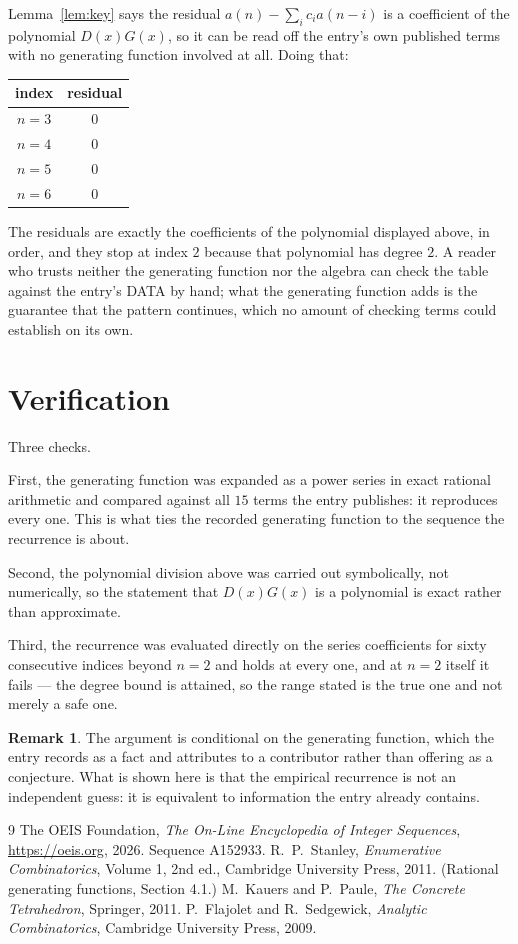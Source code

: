 \documentclass[11pt,a4paper]{article}
\theoremstyle{plain}
\theoremstyle{definition}
\newtheorem{remark}[theorem]{Remark}
\begin{document}
Lemma~\ref{lem:key} says the residual $a(n)-\sum_ic_ia(n-i)$ is a coefficient of the
polynomial $D(x)G(x)$, so it can be read off the entry's own published terms with no
generating function involved at all. Doing that:
\begin{center}
\begin{tabular}{cc}
index & residual \\ \hline
$n=3$ & $0$ \\
$n=4$ & $0$ \\
$n=5$ & $0$ \\
$n=6$ & $0$
\end{tabular}
\end{center}
The residuals are exactly the coefficients of the polynomial displayed above, in order, and
they stop at index $2$ because that polynomial has degree $2$. A reader who trusts
neither the generating function nor the algebra can check the table against the entry's DATA
by hand; what the generating function adds is the guarantee that the pattern continues, which
no amount of checking terms could establish on its own.

\section{Verification}

Three checks.

First, the generating function was expanded as a power series in exact rational arithmetic and
compared against all $15$ terms the entry publishes: it reproduces every one. This is
what ties the recorded generating function to the sequence the recurrence is about.

Second, the polynomial division above was carried out symbolically, not numerically, so the
statement that $D(x)G(x)$ is a polynomial is exact rather than approximate.

Third, the recurrence was evaluated directly on the series coefficients for sixty consecutive
indices beyond $n=2$ and holds at every one, and at $n=2$ itself it fails --- the
degree bound is attained, so the range stated is the true one and not merely a safe one.

\begin{remark}
The argument is conditional on the generating function, which the entry records as a fact and
attributes to a contributor rather than offering as a conjecture. What is shown here is that
the empirical recurrence is not an independent guess: it is equivalent to information the
entry already contains.
\end{remark}

\begin{thebibliography}{9}
 The OEIS Foundation, \emph{The On-Line Encyclopedia of Integer
Sequences}, \url{https://oeis.org}, 2026. Sequence A152933.
 R.~P.~Stanley, \emph{Enumerative Combinatorics}, Volume 1, 2nd ed.,
Cambridge University Press, 2011. (Rational generating functions, Section 4.1.)
 M.~Kauers and P.~Paule, \emph{The Concrete Tetrahedron}, Springer, 2011.
 P.~Flajolet and R.~Sedgewick, \emph{Analytic Combinatorics}, Cambridge
University Press, 2009.
\end{thebibliography}
\end{document}
